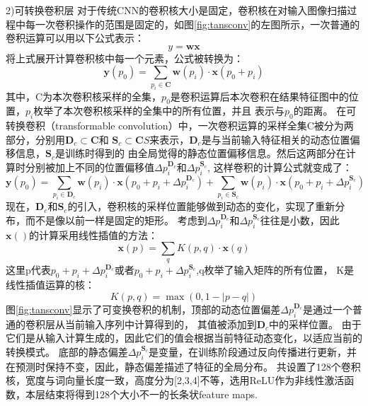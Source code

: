 2)可转换卷积层
对于传统CNN的卷积核大小是固定，卷积核在对输入图像扫描过程中每一次卷积操作的范围是固定的，如图\ref{fig:tansconv}的左图所示，一次普通的卷积运算可以用以下公式表示：
\begin{equation}
  y=\mathbf{w}\mathbf{x}
  \end{equation}
  将上式展开计算卷积核中每一个元素，公式被转换为：
  \begin{equation}
    \mathbf{y}\left(p_{0}\right)=\sum_{p_{i} \in \mathbf{C}} \mathbf{w}\left(p_{i}\right) \cdot \mathbf{x}\left(p_{0}+p_{i}\right)
    \end{equation}
其中，C为本次卷积核采样的全集，$p_{0}$是卷积运算后本次卷积在结果特征图中的位置，$p_{i}$枚举了本次卷积核采样的全集中的所有位置，并且
表示与$p_{0}$的距离。
在可转换卷积（transformable convolution）中，一次卷积运算的采样全集C被分为两部分，分别用$\mathbf{D}_{c} \subset \mathbf{C}$和
$\mathbf{S}_{c} \subset \mathbf{C}S$来表示，$\mathbf{D}_{c}$是与当前输入特征相关的动态位置偏移信息，$\mathbf{S}_{c}$是训练时得到的
由全局觉得的静态位置偏移信息。然后这两部分在计算时分别被加上不同的位置偏移值$\Delta p_{i}^{\mathbf{D}_{c}}$和$\Delta p_{i}^{\mathbf{S}_{c}}$,
这样卷积的计算公式就变成了：
\begin{equation}
  \mathbf{y}\left(p_{0}\right)= \sum_{p_{i} \in \mathbf{D}_{c}} \mathbf{w}\left(p_{i}\right) \cdot \mathbf{x}\left(p_{0}+p_{i}+\Delta p_{i}^{\mathbf{D}_{c}}\right) +\sum_{p_{i} \in \mathbf{S}_{c}} \mathbf{w}\left(p_{i}\right) \cdot \mathbf{x}\left(p_{0}+p_{i}+\Delta p_{i}^{\mathbf{S}_{c}}\right)
\end{equation}
现在，$\mathbf{D}_{c}$和$\mathbf{S}_{c}$的引入，卷积核的采样位置能够做到动态的变化，实现了重新分布，而不是像以前一样是固定的矩形。
考虑到$\Delta p_{i}^{\mathbf{D}_{c}}$和$\Delta p_{i}^{\mathbf{S}_{c}}$往往是小数，因此$\mathbf{x}()$的计算采用线性插值的方法：
\begin{equation}
\mathbf{x}(p)=\sum_{q} K(p, q) \cdot \mathbf{x}(q)
\end{equation}
这里p代表$p_{0}+p_{i}+\Delta p_{i}^{\mathbf{D}_{c}}$或者$p_{0}+p_{i}+\Delta p_{i}^{\mathbf{S}_{c}}$,q枚举了输入矩阵的所有位置，
K是线性插值运算的核：
\begin{equation}
K(p, q)=\max (0,1-|p-q|)
\end{equation}
图\ref{fig:tansconv}显示了可变换卷积的机制，顶部的动态位置偏差$\Delta p_{i}^{\mathbf{D}_{c}}$是通过一个普通的卷积层从当前输入序列中计算得到的，
其值被添加到$\mathbf{D}_{c}$中的采样位置。 由于它们是从输入计算生成的，因此它们的值会根据当前特征动态变化，以适应当前的转换模式。 
底部的静态偏差$\Delta p_{i}^{\mathbf{S}_{c}}$是变量，在训练阶段通过反向传播进行更新，并在预测时保持不变，因此，静态偏差描述了特征的全局分布。
共设置了128个卷积核，宽度与词向量长度一致，高度分为[2,3,4]不等，选用ReLU作为非线性激活函数，本层结束将得到128个大小不一的长条状feature maps.


